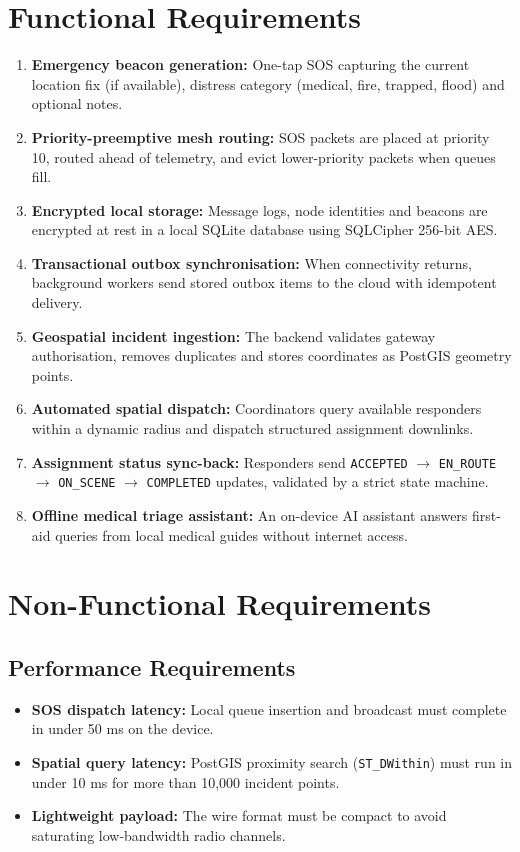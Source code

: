 \documentclass[12pt,a4paper]{report}
\begin{document}
\section{Functional Requirements}
\begin{enumerate}
    \item \textbf{Emergency beacon generation:} One-tap SOS capturing the current location fix (if available), distress category (medical, fire, trapped, flood) and optional notes.
    \item \textbf{Priority-preemptive mesh routing:} SOS packets are placed at priority 10, routed ahead of telemetry, and evict lower-priority packets when queues fill.
    \item \textbf{Encrypted local storage:} Message logs, node identities and beacons are encrypted at rest in a local SQLite database using SQLCipher 256-bit AES.
    \item \textbf{Transactional outbox synchronisation:} When connectivity returns, background workers send stored outbox items to the cloud with idempotent delivery.
    \item \textbf{Geospatial incident ingestion:} The backend validates gateway authorisation, removes duplicates and stores coordinates as PostGIS geometry points.
    \item \textbf{Automated spatial dispatch:} Coordinators query available responders within a dynamic radius and dispatch structured assignment downlinks.
    \item \textbf{Assignment status sync-back:} Responders send \texttt{ACCEPTED} $\rightarrow$ \texttt{EN\_ROUTE} $\rightarrow$ \texttt{ON\_SCENE} $\rightarrow$ \texttt{COMPLETED} updates, validated by a strict state machine.
    \item \textbf{Offline medical triage assistant:} An on-device AI assistant answers first-aid queries from local medical guides without internet access.
\end{enumerate}

\section{Non-Functional Requirements}

\subsection{Performance Requirements}
\begin{itemize}
    \item \textbf{SOS dispatch latency:} Local queue insertion and broadcast must complete in under 50 ms on the device.
    \item \textbf{Spatial query latency:} PostGIS proximity search (\texttt{ST\_DWithin}) must run in under 10 ms for more than 10,000 incident points.
    \item \textbf{Lightweight payload:} The wire format must be compact to avoid saturating low-bandwidth radio channels.
\end{itemize}
\end{document}
